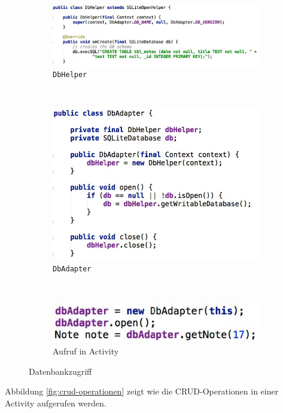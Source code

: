 \begin{figure}
	\centering
	\begin{subfigure}[b]{0.3\textwidth}
		\includegraphics[width=\textwidth]{fig/dbhelper}
		\caption{\texttt{DbHelper}}
	\end{subfigure}
	~
	\begin{subfigure}[b]{0.3\textwidth}
		\includegraphics[width=\textwidth]{fig/dbadapter}
		\caption{\texttt{DbAdapter}}
	\end{subfigure}
	~
	\begin{subfigure}[b]{0.3\textwidth}
		\includegraphics[width=\textwidth]{fig/dbadapter-activity}
		\caption{Aufruf in Activity}
	\end{subfigure}
	\caption{Datenbankzugriff}
	\label{fig:db-adaper-helper}
\end{figure}
Abbildung \ref{fig:crud-operationen} zeigt wie die CRUD-Operationen in einer Activity aufgerufen werden.
